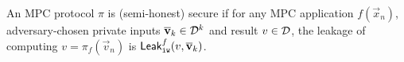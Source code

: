 \begin{definition}\label{def:securityinIW}
An MPC protocol $\pi$ is (semi-honest) secure
if for any MPC application $f(\vec{x}_n)$, adversary-chosen private inputs $\overline{\bf{v}}_k\in\mathcal{D}^k$
and result $v\in \mathcal{D}$,
the leakage of computing $v=\pi_f(\vec{v}_n)$  is ${\sf Leak}_{\tt iw}^f(v,\overline{\bf{v}}_k)$. %
\end{definition}
%


%


